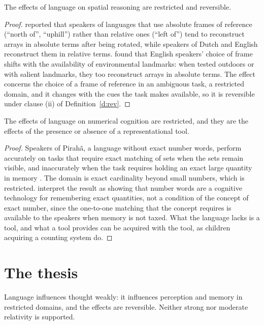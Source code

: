 \documentclass{situationist-preprint}
\begin{document}
\begin{lemma}[Space]\label{l:space}
The effects of language on spatial reasoning are restricted and reversible.
\end{lemma}

\begin{proof}
\citet{Levinson2003} reported that speakers of languages that use absolute frames of reference (\enquote{north of}, \enquote{uphill}) rather than relative ones (\enquote{left of}) tend to reconstruct arrays in absolute terms after being rotated, while speakers of Dutch and English reconstruct them in relative terms. \citet{LiGleitman2002} found that English speakers' choice of frame shifts with the availability of environmental landmarks: when tested outdoors or with salient landmarks, they too reconstruct arrays in absolute terms. The effect concerns the choice of a frame of reference in an ambiguous task, a restricted domain, and it changes with the cues the task makes available, so it is reversible under clause (ii) of Definition~\ref{d:rev}.
\end{proof}

\begin{lemma}[Number]\label{l:number}
The effects of language on numerical cognition are restricted, and they are the effects of the presence or absence of a representational tool.
\end{lemma}

\begin{proof}
Speakers of Pirahã, a language without exact number words, perform accurately on tasks that require exact matching of sets when the sets remain visible, and inaccurately when the task requires holding an exact large quantity in memory \citep{Gordon2004,Frank2008}. The domain is exact cardinality beyond small numbers, which is restricted. \citet{Frank2008} interpret the result as showing that number words are a cognitive technology for remembering exact quantities, not a condition of the concept of exact number, since the one-to-one matching that the concept requires is available to the speakers when memory is not taxed. What the language lacks is a tool, and what a tool provides can be acquired with the tool, as children acquiring a counting system do.
\end{proof}

\section{The thesis}

\begin{theorem}\label{t:main}
Language influences thought weakly: it influences perception and memory in restricted domains, and the effects are reversible. Neither strong nor moderate relativity is supported.
\end{theorem}
\end{document}
